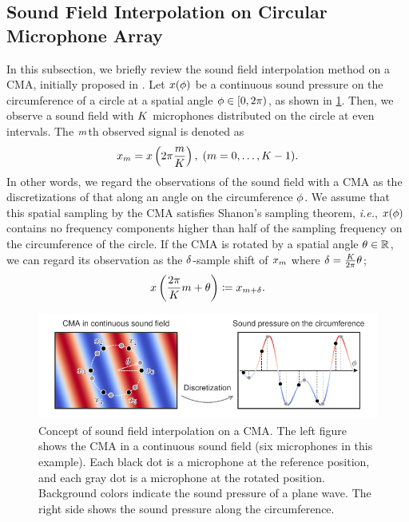 \documentclass[sip,biber]{now-journal}
\begin{document}
\subsection{Sound Field Interpolation on Circular Microphone Array}
In this subsection, we briefly review the sound field interpolation method on a CMA, initially proposed in \cite{Wakabayashi:2021:ICASSP,Wakabayashi:2023:ASLP}.
Let $x (\phi)$ be a continuous sound pressure on the circumference of a circle at a spatial angle $\rotCoor \in \interval[open right,soft open fences]{0}{2\pi}$, as shown in \cref{fig:sfi}.
Then, we observe a sound field with $K$ microphones distributed on the circle at even intervals.
The $m$th observed signal is denoted as
\begin{equation}
  \sfcma _{\mic} = \sfcma \left(2\pi \frac{\mic}{\Mic}\right),\; (\mic = 0, \dots, \Mic - 1).%
  \label{eq:sfi:model}
\end{equation}
In other words, we regard the observations of the sound field with a CMA as the discretizations of that along an angle on the circumference $\phi$.
We assume that this spatial sampling by the CMA satisfies Shanon's sampling theorem, \emph{i.e.}, $x (\phi)$ contains no frequency components higher than half of the sampling frequency on the circumference of the circle.
If the CMA is rotated by a spatial angle $\theta \in \mathbb{R}$, we can regard its observation as the $\delta$-sample shift of $x _{m}$ where $\delta = \frac{K}{2\pi} \theta$;
\begin{equation}
  \sfcma \left(\frac{2\pi}{\Mic} \mic + \rotSpat \right)%
  \coloneqq
  \sfcma _{\mic + \rotSmpl}.
  \label{eq:sfi:shift:obs}
\end{equation}
\begin{figure}[t]
  \centering
  \includegraphics{figures/diagrams/sfi.pdf}
  \caption{%
    Concept of sound field interpolation on a CMA.
    The left figure shows the CMA in a continuous sound field (six microphones in this example).
    Each black dot is a microphone at the reference position, and each gray dot is a microphone at the rotated position.
    Background colors indicate the sound pressure of a plane wave.
    The right side shows the sound pressure along the circumference.
  }%
  \label{fig:sfi}
\end{figure}
\end{document}
